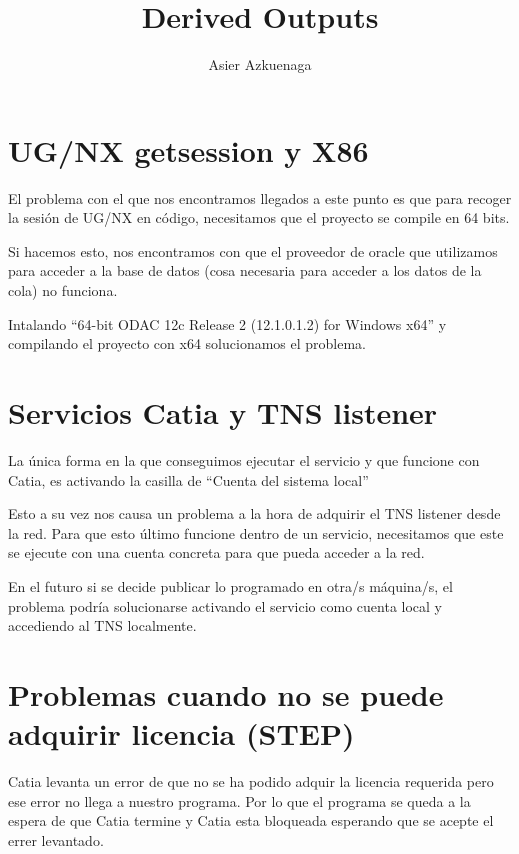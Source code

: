 \documentclass[12pt]{article}
\begin{document}
\title{Derived Outputs}
\author{Asier Azkuenaga}
\maketitle


\section {UG/NX getsession y X86}
El problema con el que nos encontramos llegados a este punto es que para recoger la sesión de UG/NX en código, necesitamos que el proyecto se compile en 64 bits. 

Si hacemos esto, nos encontramos con que el proveedor de oracle que utilizamos para acceder a la base de datos (cosa necesaria para acceder a los datos de la cola) no funciona.

Intalando ``64-bit ODAC 12c Release 2 (12.1.0.1.2) for Windows x64'' y compilando el proyecto con x64 solucionamos el problema.

\section {Servicios Catia y TNS listener}
La única forma en la que conseguimos ejecutar el servicio y que funcione con Catia, es activando la casilla de ``Cuenta del sistema local''

Esto a su vez nos causa un problema a la hora de adquirir el TNS listener desde la red. Para que esto último funcione dentro de un servicio, necesitamos que este se ejecute con una cuenta concreta para que pueda acceder a la red.

En el futuro si se decide publicar lo programado en otra/s máquina/s, el problema podría solucionarse activando el servicio como cuenta local y accediendo al TNS localmente.

\section {Problemas cuando no se puede adquirir licencia (STEP)}
Catia levanta un error de que no se ha podido adquir la licencia requerida pero ese error no llega a nuestro programa. Por lo que el programa se queda a la espera de que Catia termine y Catia esta bloqueada esperando que se acepte el errer levantado.
\end{document}
